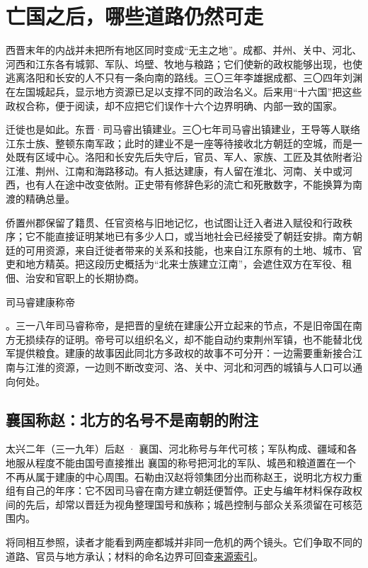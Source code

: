 \section{亡国之后，哪些道路仍然可走}
\label{sec:eastern-jin-opening-fracture-migration}

西晋末年的内战并未把所有地区同时变成“无主之地”。成都、并州、关中、河北、河西和江东各有城郭、军队、坞壁、牧地与粮路；它们使新的政权能够出现，也使逃离洛阳和长安的人不只有一条向南的路线。三〇三年李雄据成都、三〇四年刘渊在左国城起兵，显示地方资源已足以支撑不同的政治名义。后来用“十六国”把这些政权合称，便于阅读，却不应把它们误作十六个边界明确、内部一致的国家。

迁徙也是如此。\hypertarget{evt:JH-0307-SIMA-RUI-JIANYE}{\textcolor{dynasty}{东晋·司马睿出镇建业}}。三〇七年司马睿出镇建业，王导等人联络江东士族、整顿东南军政；此时的建业不是一座等待接收北方朝廷的空城，而是一处既有区域中心。洛阳和长安先后失守后，官员、军人、家族、工匠及其依附者沿江淮、荆州、江南和海路移动。有人抵达建康，有人留在淮北、河南、关中或河西，也有人在途中改变依附。正史带有修辞色彩的流亡和死散数字，不能换算为南渡的精确总量。

侨置州郡保留了籍贯、任官资格与旧地记忆，也试图让迁入者进入赋役和行政秩序；它不能直接证明某地已有多少人口，或当地社会已经接受了朝廷安排。南方朝廷的可用资源，来自迁徙者带来的关系和技能，也来自江东原有的土地、城市、官吏和地方精英。把这段历史概括为“北来士族建立江南”，会遮住双方在军役、租佃、治安和官职上的长期协商。

\hypertarget{evt:JH-0318-YUAN-EMPEROR}{\textcolor{dynasty}{司马睿建康称帝}}。三一八年司马睿称帝，是把晋的皇统在建康公开立起来的节点，不是旧帝国在南方无损续存的证明。帝号可以组织名义，却不能自动约束荆州军镇，也不能替北伐军提供粮食。建康的故事因此同北方多政权的故事不可分开：一边需要重新接合江南与江淮的资源，一边则不断改变河、洛、关中、河北和河西的城镇与人口可以通向何处。

\subsection{襄国称赵：北方的名号不是南朝的附注}
\begin{event}{}{太兴二年（三一九年）}{后赵 · 襄国、河北}{称号与年代可核；军队构成、疆域和各地服从程度不能由国号直接推出}
襄国的称号把河北的军队、城邑和粮道置在一个不再从属于建康的中心周围。石勒由汉赵将领集团分出而称赵王，说明北方权力重组有自己的年序：它不因司马睿在南方建立朝廷便暂停。正史与编年材料保存政权间的先后，却常以晋廷为视角整理国号和族称；城邑控制与部众关系须留在可核范围内。

将同相互参照，读者才能看到两座都城并非同一危机的两个镜头。它们争取不同的道路、官员与地方承认；材料的命名边界可回查\hyperref[app:sources]{来源索引}。
\end{event}

